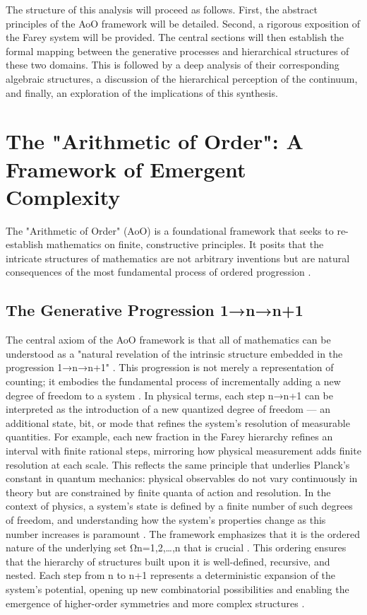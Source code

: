 \documentclass[12pt,a4paper]{article}
\theoremstyle{definition}
\theoremstyle{remark}
\begin{document}
The structure of this analysis will proceed as follows. First, the abstract principles of the AoO framework will be detailed. Second, a rigorous exposition of the Farey system will be provided. The central sections will then establish the formal mapping between the generative processes and hierarchical structures of these two domains. This is followed by a deep analysis of their corresponding algebraic structures, a discussion of the hierarchical perception of the continuum, and finally, an exploration of the implications of this synthesis.
\section{The "Arithmetic of Order": A Framework of Emergent Complexity}
The "Arithmetic of Order" (AoO) is a foundational framework that seeks to re-establish mathematics on finite, constructive principles. It posits that the intricate structures of mathematics are not arbitrary inventions but are natural consequences of the most fundamental process of ordered progression \cite{ElKhettabi2025AoO}.
\subsection{The Generative Progression 1→n→n+1}
The central axiom of the AoO framework is that all of mathematics can be understood as a "natural revelation of the intrinsic structure embedded in the progression 1→n→n+1" \cite{ElKhettabi2025AoO}. This progression is not merely a representation of counting; it embodies the fundamental process of incrementally adding a new degree of freedom to a system \cite{ElKhettabi2025AoO, ElKhettabi2024HCN}. In physical terms, each step n→n+1 can be interpreted as the introduction of a new quantized degree of freedom — an additional state, bit, or mode that refines the system’s resolution of measurable quantities. For example, each new fraction in the Farey hierarchy refines an interval with finite rational steps, mirroring how physical measurement adds finite resolution at each scale. This reflects the same principle that underlies Planck’s constant in quantum mechanics: physical observables do not vary continuously in theory but are constrained by finite quanta of action and resolution. In the context of physics, a system's state is defined by a finite number of such degrees of freedom, and understanding how the system's properties change as this number increases is paramount \cite{ElKhettabi2024HCN}.
The framework emphasizes that it is the ordered nature of the underlying set Ωn​={1,2,…,n} that is crucial \cite{ElKhettabi2025AoO}. This ordering ensures that the hierarchy of structures built upon it is well-defined, recursive, and nested. Each step from n to n+1 represents a deterministic expansion of the system's potential, opening up new combinatorial possibilities and enabling the emergence of higher-order symmetries and more complex structures \cite{ElKhettabi2025AoO}.
\end{document}

